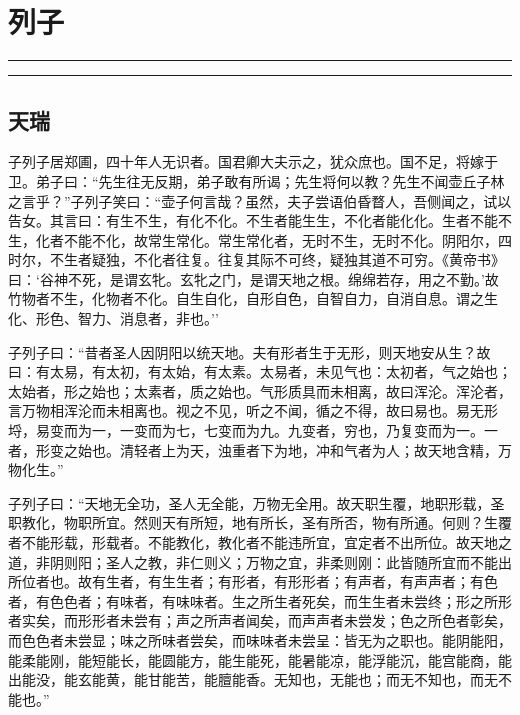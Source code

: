 \documentclass[]{article}
\date{}
\begin{document}
\hypertarget{header-n0}{%
\section{列子}\label{header-n0}}

\begin{center}\rule{0.5\linewidth}{\linethickness}\end{center}

\tableofcontents

\begin{center}\rule{0.5\linewidth}{\linethickness}\end{center}

\hypertarget{header-n6}{%
\subsection{天瑞}\label{header-n6}}

子列子居郑圃，四十年人无识者。国君卿大夫示之，犹众庶也。国不足，将嫁于卫。弟子曰：``先生往无反期，弟子敢有所谒；先生将何以教？先生不闻壶丘子林之言乎？''子列子笑曰：``壶子何言哉？虽然，夫子尝语伯昏瞀人，吾侧闻之，试以告女。其言曰：有生不生，有化不化。不生者能生生，不化者能化化。生者不能不生，化者不能不化，故常生常化。常生常化者，无时不生，无时不化。阴阳尔，四时尔，不生者疑独，不化者往复。往复其际不可终，疑独其道不可穷。《黄帝书》曰：`谷神不死，是谓玄牝。玄牝之门，是谓天地之根。绵绵若存，用之不勤。'故竹物者不生，化物者不化。自生自化，自形自色，自智自力，自消自息。谓之生化、形色、智力、消息者，非也。''

子列子曰：``昔者圣人因阴阳以统天地。夫有形者生于无形，则天地安从生？故曰：有太易，有太初，有太始，有太素。太易者，未见气也：太初者，气之始也；太始者，形之始也；太素者，质之始也。气形质具而未相离，故曰浑沦。浑沦者，言万物相浑沦而未相离也。视之不见，听之不闻，循之不得，故曰易也。易无形埒，易变而为一，一变而为七，七变而为九。九变者，穷也，乃复变而为一。一者，形变之始也。清轻者上为天，浊重者下为地，冲和气者为人；故天地含精，万物化生。''

子列子曰：``天地无全功，圣人无全能，万物无全用。故天职生覆，地职形载，圣职教化，物职所宜。然则天有所短，地有所长，圣有所否，物有所通。何则？生覆者不能形载，形载者。不能教化，教化者不能违所宜，宜定者不出所位。故天地之道，非阴则阳；圣人之教，非仁则义；万物之宜，非柔则刚：此皆随所宜而不能出所位者也。故有生者，有生生者；有形者，有形形者；有声者，有声声者；有色者，有色色者；有味者，有味味者。生之所生者死矣，而生生者未尝终；形之所形者实矣，而形形者未尝有；声之所声者闻矣，而声声者未尝发；色之所色者彰矣，而色色者未尝显；味之所味者尝矣，而味味者未尝呈：皆无为之职也。能阴能阳，能柔能刚，能短能长，能圆能方，能生能死，能暑能凉，能浮能沉，能宫能商，能出能没，能玄能黄，能甘能苦，能膻能香。无知也，无能也；而无不知也，而无不能也。''
\end{document}
